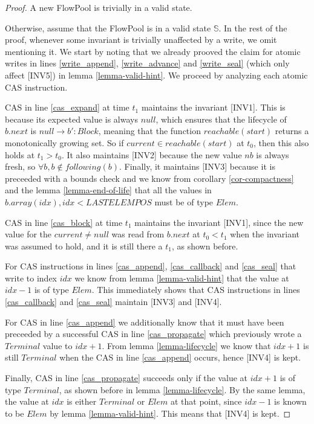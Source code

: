 \documentclass[runningheads,a4paper]{llncs}
\begin{document}
\begin{proof}
A new FlowPool is trivially in a valid state.

Otherwise, assume that the FlowPool is in a valid state
$\mathbb{S}$.
In the rest of the proof, whenever some invariant is trivially
unaffected by a write, we omit mentioning it.
We start by noting that we already prooved the claim
for atomic writes in lines \ref{write_append}, \ref{write_advance} and
\ref{write_seal} (which only affect [INV5]) in lemma
\ref{lemma-valid-hint}.
We proceed by analyzing each atomic CAS instruction.

CAS in line \ref{cas_expand} at time $t_1$ maintains the invariant
[INV1].
This is because its expected value is always
$null$, which ensures that the lifecycle of $b.next$ is $null
\rightarrow b': Block$, meaning that the function $reachable(start)$
returns a monotonically growing set.
So if $current \in reachable(start)$ at $t_0$, then this also holds at
$t_1 > t_0$.
It also maintains [INV2] because the new value $nb$ is always fresh,
so $\forall b, b \not \in following(b)$.
Finally, it maintains [INV3] because it is preceeded with a bounds
check and we know from corollary \ref{cor-compactness} and the
lemma \ref{lemma-end-of-life} that all the values in $b.array(idx),
idx < LASTELEMPOS$ must be of type $Elem$.

CAS in line \ref{cas_block} at time $t_1$ maintains the
invariant [INV1], since the new value for the $current \neq null$ was read from
$b.next$ at $t_0 < t_1$ when the invariant was assumed to hold, and
it is still there a $t_1$, as shown before.

For CAS instructions in lines \ref{cas_append}, \ref{cas_callback} and
\ref{cas_seal} that write to index $idx$ we know from lemma
\ref{lemma-valid-hint} that the value at $idx - 1$ is of type $Elem$.
This immediately shows that CAS instructions in lines
\ref{cas_callback} and \ref{cas_seal} maintain [INV3] and [INV4].

For CAS in line \ref{cas_append} we additionally know that it must
have been preceeded by a successful CAS in line \ref{cas_propagate}
which previously wrote a $Terminal$ value to $idx + 1$. From lemma
\ref{lemma-lifecycle} we know that $idx + 1$ is still $Terminal$ when
the CAS in line \ref{cas_append} occurs, hence [INV4] is kept.

Finally, CAS in line \ref{cas_propagate} succeeds only if the value at
$idx + 1$ is of type $Terminal$, as shown before in lemma
\ref{lemma-lifecycle}.
By the same lemma, the value at $idx$ is either
$Terminal$ or $Elem$ at that point, since $idx - 1$ is known to be
$Elem$ by lemma \ref{lemma-valid-hint}.
This means that [INV4] is kept.
\end{proof}
\end{document}
